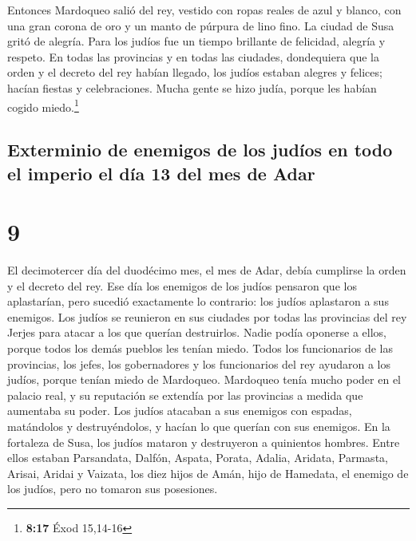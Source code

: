  Entonces Mardoqueo salió del rey, vestido con ropas
reales de azul y blanco, con una gran corona de oro y un manto de
púrpura de lino fino. La ciudad de Susa gritó de alegría.
 Para los judíos fue un tiempo brillante de felicidad,
alegría y respeto.  En todas las provincias y en todas
las ciudades, dondequiera que la orden y el decreto del rey habían
llegado, los judíos estaban alegres y felices; hacían fiestas y
celebraciones. Mucha gente se hizo judía, porque les habían cogido
miedo.\footnote{\textbf{8:17} Éxod 15,14-16}

\hypertarget{exterminio-de-enemigos-de-los-juduxedos-en-todo-el-imperio-el-duxeda-13-del-mes-de-adar}{%
\subsection{Exterminio de enemigos de los judíos en todo el imperio el
día 13 del mes de
Adar}\label{exterminio-de-enemigos-de-los-juduxedos-en-todo-el-imperio-el-duxeda-13-del-mes-de-adar}}

\hypertarget{section-8}{%
\section{9}\label{section-8}}

 El decimotercer día del duodécimo mes, el mes de Adar,
debía cumplirse la orden y el decreto del rey. Ese día los enemigos de
los judíos pensaron que los aplastarían, pero sucedió exactamente lo
contrario: los judíos aplastaron a sus enemigos.  Los
judíos se reunieron en sus ciudades por todas las provincias del rey
Jerjes para atacar a los que querían destruirlos. Nadie podía oponerse a
ellos, porque todos los demás pueblos les tenían miedo. 
Todos los funcionarios de las provincias, los jefes, los gobernadores y
los funcionarios del rey ayudaron a los judíos, porque tenían miedo de
Mardoqueo.  Mardoqueo tenía mucho poder en el palacio
real, y su reputación se extendía por las provincias a medida que
aumentaba su poder.  Los judíos atacaban a sus enemigos
con espadas, matándolos y destruyéndolos, y hacían lo que querían con
sus enemigos.  En la fortaleza de Susa, los judíos mataron
y destruyeron a quinientos hombres.  Entre ellos estaban
Parsandata, Dalfón, Aspata,  Porata, Adalia, Aridata,
 Parmasta, Arisai, Aridai y Vaizata,  los
diez hijos de Amán, hijo de Hamedata, el enemigo de los judíos, pero no
tomaron sus posesiones.


